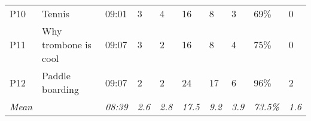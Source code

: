 \begin{table*}[t]
\begin{tabularx}{\textwidth}{p{0.5cm}p{3cm}p{1cm}p{1cm}p{1cm}p{1cm}p{1cm}p{1cm}p{1cm}p{1cm}}
P10         & Tennis                                                                 & 09:01                                                                    & 3                                                                      & 4                                                                   & 16                                                            & 8                                                                    & 3                                                                      & 69\%                                                                          & 0                                                                        \\
P11         & Why trombone is cool                                                   & 09:07                                                                    & 3                                                                      & 2                                                                   & 16                                                            & 8                                                                    & 4                                                                      & 75\%                                                                          & 0                                                                        \\
P12         & Paddle boarding                                                        & 09:07                                                                    & 2                                                                      & 2                                                                   & 24                                                            & 17                                                                   & 6                                                                      & 96\%                                                                          & 2                                                                        \\
\hline
\textit{Mean}        &                                                                        & \textit{08:39}                                                                    & \textit{2.6}                                                                    & \textit{2.8 }                                                                & \textit{17.5}                                                          & \textit{9.2}                                                                  & \textit{3.9 }                                                                   & \textit{73.5\%}                                                                        & \textit{1.6}  \\

\end{tabularx}
\end{table*}
